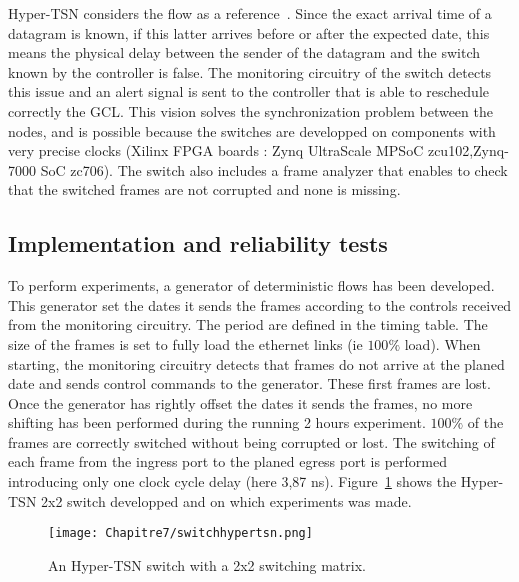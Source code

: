 Hyper-TSN considers the flow as a reference~\cite{leclerc2020optical}. Since the exact arrival time of a datagram is known, if this latter arrives before or after the expected date, this means the physical delay between the sender of the datagram and the switch known by the controller is false. The monitoring circuitry of the switch detects this issue and an alert signal is sent to the controller that is able to reschedule correctly the GCL.
This vision solves the synchronization problem between the nodes, and is possible because the switches are developped on components with very precise clocks (Xilinx FPGA boards : Zynq UltraScale MPSoC zcu102,Zynq-7000 SoC zc706). 
The switch also includes a frame analyzer that enables to check that the switched frames are not corrupted and none is missing.

\subsection{Implementation and reliability tests}

To perform experiments, a generator of deterministic flows has been developed. This generator set the dates it sends the frames according to the controls received from the monitoring circuitry. The period are defined in the timing table. The size of the frames is set to fully load the ethernet links (ie $100\%$ load).
When starting, the monitoring circuitry detects that frames do not arrive at the planed date and sends control commands to the generator. These first frames are lost. Once the generator has rightly offset the dates it sends the frames, no more shifting has been performed during the running 2 hours experiment. $100\%$ of the frames are correctly switched without being corrupted or lost. The switching of each frame from the ingress port to the planed egress port is performed introducing only one clock cycle delay (here 3,87 ns).
Figure~\ref{fig:hypertsnswitch} shows the Hyper-TSN 2x2 switch developped and on which experiments was made.
\begin{center}

\begin{figure}[h]
  \centering
\texttt{[image: Chapitre7/switchhypertsn.png]}
\caption{ An Hyper-TSN switch with a 2x2 switching matrix.}
\label{fig:hypertsnswitch}
\end{figure}
\end{center}
